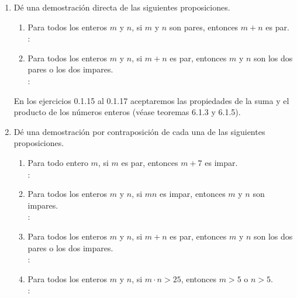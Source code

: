 \begin{enumerate}[label=0.1.\arabic*]
	\item Dé una demostración directa de las siguientes proposiciones.
	\begin{enumerate}[label=\arabic*)]
		\item Para todos los enteros $ m $ y $ n $, si $ m $ y $ n $ son pares, entonces $ m + n $ es par. \\
		\solucion: \\
		
		\item Para todos los enteros $ m $ y $ n $, si $ m+n $ es par, entonces $ m $ y $ n $ son los dos pares o los dos impares. \\
		\solucion: \\
		
	\end{enumerate}

	En los ejercicios 0.1.15 al 0.1.17 aceptaremos las propiedades de la suma y el producto de los números enteros (véase teoremas 6.1.3 y 6.1.5).
	
	\item Dé una demostración por contraposición de cada una de las siguientes proposiciones.
	\begin{enumerate}[label=\arabic*)]
		\item Para todo entero $ m $, si $ m $ es par, entonces $ m+7 $ es impar. \\
		\solucion: \\
		
		\item Para todos los enteros $ m $ y $ n $, si $ mn $ es impar, entonces $ m $ y $ n $ son impares. \\
		\solucion: \\
		
		\item Para todos los enteros $ m $ y $ n $, si $ m+n $ es par, entonces $ m $ y $ n $ son los dos pares o los dos impares. \\
		\solucion: \\
		
		\item Para todos los enteros $ m $ y $ n $, si $ m \cdot n > 25 $, entonces $ m > 5 $ o $ n > 5 $. \\
		\solucion: \\
	\end{enumerate}


\end{enumerate}
